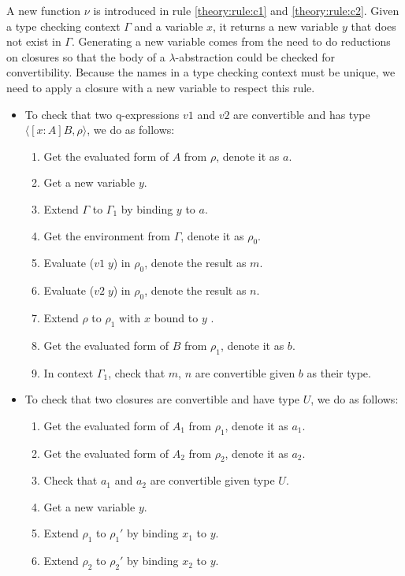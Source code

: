 A new function $\nu$ is introduced in rule \ref{theory:rule:c1} and \ref{theory:rule:c2}. Given a type checking context $\Gamma$ and a variable $x$, it returns a new variable $y$ that does not exist in $\Gamma$. Generating a new variable comes from the need to do reductions on closures so that the body of a $\lambda$-abstraction could be checked for convertibility. Because the names in a type checking context must be unique, we need to apply a closure with a new variable to respect this rule.

\begin{itemize}
  \item To check that two q-expressions $v1$ and $v2$ are convertible and has type $\langle [x : A] B, \rho \rangle$, we do as follows:
    \begin{enumerate}
    \item Get the evaluated form of $A$ from $\rho$, denote it as $a$.
    \item Get a new variable $y$.
    \item Extend $\Gamma$ to $\Gamma_1$ by binding $y$ to $a$.
    \item Get the environment from $\Gamma$, denote it as $\rho_0$.
    \item Evaluate ($v1 \; y$) in $\rho_0$, denote the result as $m$.
    \item Evaluate ($v2 \; y$) in $\rho_0$, denote the result as $n$.
    \item Extend $\rho$ to $\rho_1$ with $x$ bound to $y$ .
    \item Get the evaluated form of $B$ from $\rho_1$, denote it as $b$.
    \item In context $\Gamma_1$, check that $m$, $n$ are convertible given $b$ as their type.
    \end{enumerate}
  \item To check that two closures are convertible and have type $U$, we do as follows:
    \begin{enumerate}
    \item Get the evaluated form of $A_1$ from $\rho_1$, denote it as $a_1$.
    \item Get the evaluated form of $A_2$ from $\rho_2$, denote it as $a_2$.
    \item Check that $a_1$ and $a_2$ are convertible given type $U$.
    \item Get a new variable $y$.
    \item Extend $\rho_1$ to $\rho_1'$ by binding $x_1$ to $y$.
    \item Extend $\rho_2$ to $\rho_2'$ by binding $x_2$ to $y$.

\end{enumerate}
\end{itemize}
